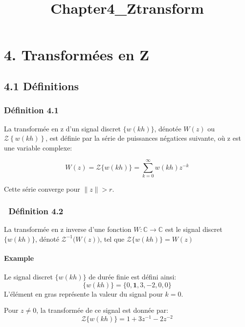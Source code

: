 \documentclass[11pt]{article}
\title{Chapter4\_Ztransform}
\begin{document}
    
    \maketitle
    
    

    
    \section{4. Transformées en Z}\label{transformuxe9es-en-z}

    \subsection{4.1 Définitions}\label{duxe9finitions}

    \subsubsection{Définition 4.1}\label{duxe9finition-4.1}

La transformée en z d'un signal discret \(\big\{w(kh)\big\}\), dénotée
\(W(z)\) ou \(\mathscr{Z}\left\{w(kh)\right\}\), est définie par la
série de puissances négatices suivante, où z est une variable complexe:

\[ W(z) = \mathscr{Z}\big\{w(kh)\big\} = \sum_{k=0}^{\infty}w(kh)z^{-k} \]

Cette série converge pour \(\|z\|>r\).

    \subsubsection{~Définition 4.2}\label{duxe9finition-4.2}

La transformée en z inverse d'une fonction
\(W:\mathbb{C} \rightarrow \mathbb{C}\) est le signal discret
\(\big\{w(kh)\big\}\), dénoté \(\mathscr{Z}^{-1}\big(W(z)\big)\), tel
que \(\mathscr{Z}\big\{w(kh)\big\}=W(z)\)

    \paragraph{Example}\label{example}

Le signal discret \(\big\{w(kh)\big\}\) de durée finie est défini ainsi:
\[ \big\{w(kh)\big\} = \{ 0, \mathbf{1}, 3, -2, 0, 0 \}\] L'élément en
gras représente la valeur du signal pour \(k=0\).

Pour \(z\neq0\), la transformée de ce signal est donnée par:
\[ \mathscr{Z}\{w(kh)\} = 1 + 3z^{-1} -2z^{-2} \]
\end{document}
